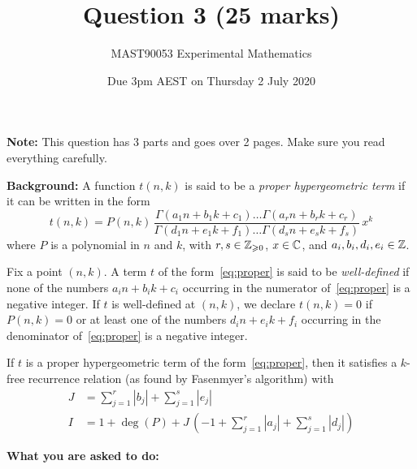 \documentclass[12pt]{scrartcl}
\title{Question 3 (25 marks)}
\author{MAST90053 Experimental Mathematics}
\date{Due 3pm AEST on Thursday 2 July 2020}
\begin{document}
\thispagestyle{scrheadings}

\maketitle

\textbf{Note:} This question has 3 parts and goes over 2 pages.
Make sure you read everything carefully.

  \textbf{Background:} A function $t(n,k)$ is said to be a \emph{proper hypergeometric term} if it can be written in the form
  \begin{equation}
    \label{eq:proper}
    t(n,k) = P(n,k)\,\frac{\Gamma(a_1n+b_1k+c_1)\dots \Gamma(a_rn+b_rk+c_r)}{\Gamma(d_1n+e_1k+f_1)\dots \Gamma(d_sn+e_sk+f_s)}\,x^k
  \end{equation}
  where $P$ is a polynomial in $n$ and $k$, with $r,s\in\mathbb{Z}_{\geqslant 0}$, $x\in\mathbb{C}$, and $a_i,b_i,d_i,e_i\in\mathbb{Z}$.

  Fix a point $(n,k)$.
  A term $t$ of the form~\eqref{eq:proper} is said to be \emph{well-defined} if none of the numbers $a_in+b_ik+c_i$ occurring in the numerator of~\eqref{eq:proper} is a negative integer.
  If $t$ is well-defined at $(n,k)$, we declare $t(n,k)=0$ if $P(n,k)=0$ or at least one of the numbers $d_in+e_ik+f_i$ occurring in the denominator of~\eqref{eq:proper} is a negative integer.

  If $t$ is a proper hypergeometric term of the form~\eqref{eq:proper}, then it satisfies a $k$-free recurrence relation (as found by Fasenmyer's algorithm) with
  \begin{align*}
    J &= \sum_{j=1}^r |b_j| + \sum_{j=1}^s |e_j|\\
    I &= 1 + \deg(P) + J\,\left(-1+\sum_{j=1}^r |a_j| + \sum_{j=1}^s |d_j|\right)
  \end{align*}

  \textbf{What you are asked to do:}
\end{document}
